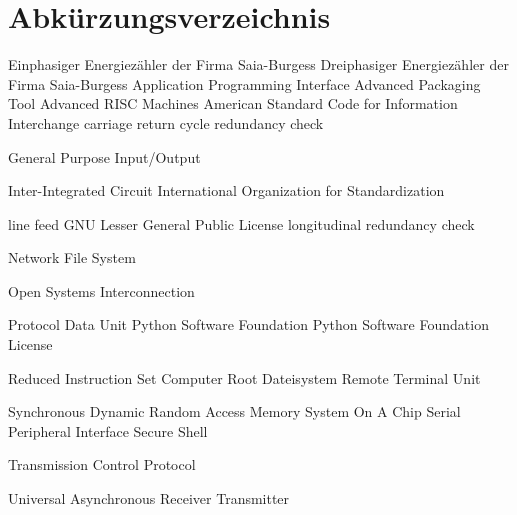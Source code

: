 
\chapter*{Abkürzungsverzeichnis}
\begin{acronym}[abbreviations]



 {Einphasiger Energiezähler der Firma Saia-Burgess}
 {Dreiphasiger Energiezähler der Firma Saia-Burgess}
 {Application Programming Interface}
 {Advanced Packaging Tool}
 {Advanced \acs{RISC} Machines}
 {American Standard Code for Information Interchange}
 {carriage return}
 {cycle redundancy check}

 {General Purpose Input/Output}

 {Inter-Integrated Circuit}
 {International Organization for Standardization}

 {line feed}
 {GNU Lesser General Public License}
 {longitudinal redundancy check}

 {Network File System}

 {Open Systems Interconnection}

 {Protocol Data Unit}
 {Python Software Foundation}
 {Python Software Foundation License}

 {Reduced Instruction Set Computer}
 {Root Dateisystem}
 {Remote Terminal Unit}

 {Synchronous Dynamic Random Access Memory}
 {System On A Chip}
 {Serial Peripheral Interface}
 {Secure Shell}

 {Transmission Control Protocol}

 {Universal Asynchronous Receiver Transmitter}
\end{acronym}
